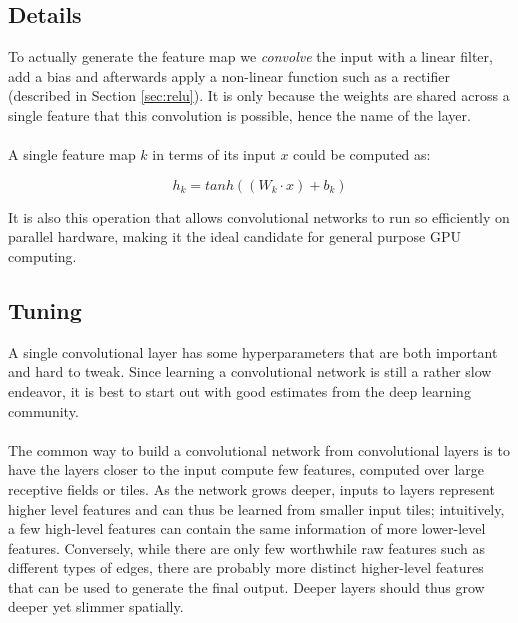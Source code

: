 \subsection{Details}
\label{sub:details}
To actually generate the feature map
we \textit{convolve} the input with a linear filter,
add a bias and afterwards apply a non-linear function
such as a rectifier
(described in Section \ref{sec:relu}).
It is only because the weights are shared across a single feature
that this convolution is possible,
hence the name of the layer.

\paragraph{}
A single feature map $k$ in terms of its input $x$ could be computed as:

\begin{equation}
  h_k = tanh((W_k \cdot x) + b_k)
\end{equation}

It is also this operation that allows convolutional networks
to run so efficiently on parallel hardware,
making it the ideal candidate
for general purpose GPU computing.

\subsection{Tuning}
A single convolutional layer
has some hyperparameters that are both important
and hard to tweak.
Since learning a convolutional network
is still a rather slow endeavor,
it is best to start out with good estimates from the deep learning community.

\paragraph{}
The common way to build a convolutional network
from convolutional layers is to have
the layers closer to the input compute
few features,
computed over large receptive fields or tiles.
As the network grows deeper,
inputs to layers represent higher level features
and can thus be learned from smaller input tiles;
intuitively, a few high-level features
can contain the same information of more
lower-level features.
Conversely, while there are only few
worthwhile raw features such as different types of edges,
there are probably more distinct higher-level features
that can be used to generate the final output.
Deeper layers should thus grow deeper yet slimmer spatially.

